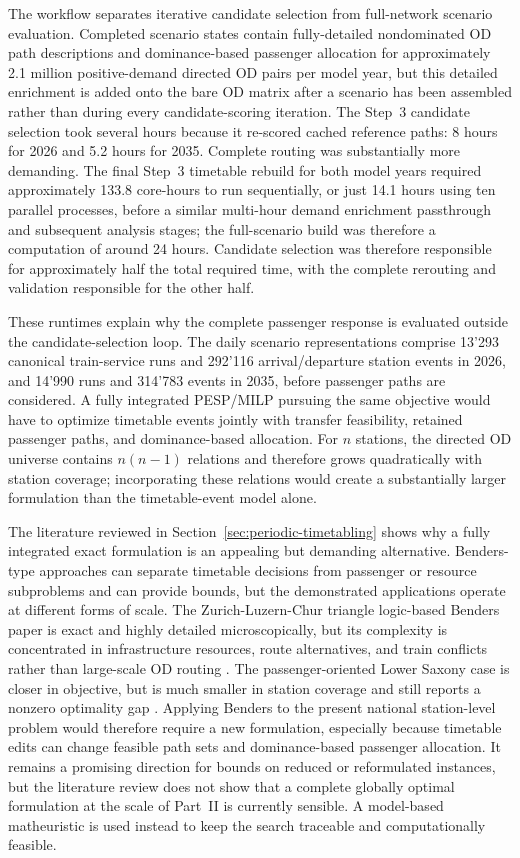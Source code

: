 \documentclass[preprint,12pt]{elsarticle}
\begin{document}
The workflow separates iterative candidate selection from full-network scenario evaluation. Completed scenario states contain fully-detailed nondominated OD path descriptions and dominance-based passenger allocation for approximately 2.1 million positive-demand directed OD pairs per model year, but this detailed enrichment is added onto the bare OD matrix after a scenario has been assembled rather than during every candidate-scoring iteration. The Step~3 candidate selection took several hours because it re-scored cached reference paths: 8 hours for 2026 and 5.2 hours for 2035. Complete routing was substantially more demanding. The final Step~3 timetable rebuild for both model years required approximately 133.8 core-hours to run sequentially, or just 14.1 hours using ten parallel processes, before a similar multi-hour demand enrichment passthrough and subsequent analysis stages; the full-scenario build was therefore a computation of around 24 hours. Candidate selection was therefore responsible for approximately half the total required time, with the complete rerouting and validation responsible for the other half.

These runtimes explain why the complete passenger response is evaluated outside the candidate-selection loop. The daily scenario representations comprise 13'293 canonical train-service runs and 292'116 arrival/departure station events in 2026, and 14'990 runs and 314'783 events in 2035, before passenger paths are considered. A fully integrated PESP/MILP pursuing the same objective would have to optimize timetable events jointly with transfer feasibility, retained passenger paths, and dominance-based allocation. For \(n\) stations, the directed OD universe contains \(n(n-1)\) relations and therefore grows quadratically with station coverage; incorporating these relations would create a substantially larger formulation than the timetable-event model alone.


The literature reviewed in Section~\ref{sec:periodic-timetabling} shows why a fully integrated exact formulation is an appealing but demanding alternative. Benders-type approaches can separate timetable decisions from passenger or resource subproblems and can provide bounds, but the demonstrated applications operate at different forms of scale. The Zurich-Luzern-Chur triangle logic-based Benders paper is exact and highly detailed microscopically, but its complexity is concentrated in infrastructure resources, route alternatives, and train conflicts rather than large-scale OD routing \citep{leutwilerCorman2022LogicBenders}. The passenger-oriented Lower Saxony case is closer in objective, but is much smaller in station coverage and still reports a nonzero optimality gap \citep{yaoEtAl2025HybridBenders}. Applying Benders to the present national station-level problem would therefore require a new formulation, especially because timetable edits can change feasible path sets and dominance-based passenger allocation. It remains a promising direction for bounds on reduced or reformulated instances, but the literature review does not show that a complete globally optimal formulation at the scale of Part~II is currently sensible. A model-based matheuristic is used instead to keep the search traceable and computationally feasible.
\end{document}
